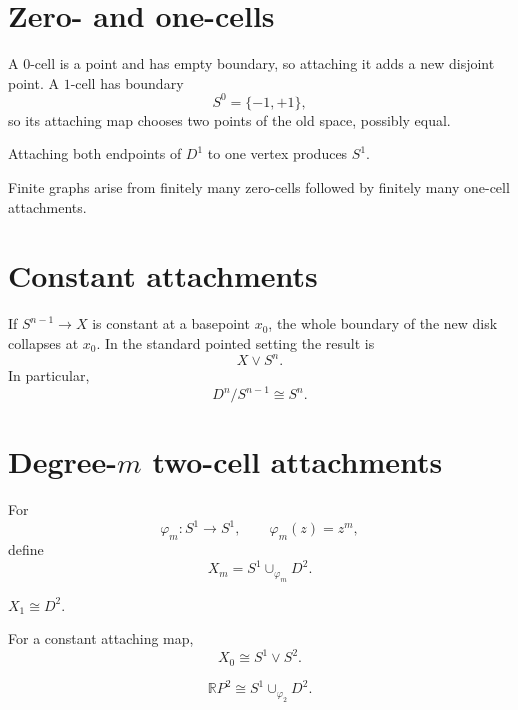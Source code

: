 \section{Zero- and one-cells}
A \(0\)-cell is a point and has empty boundary, so attaching it adds a new
disjoint point.  A \(1\)-cell has boundary
\[
S^0=\{-1,+1\},
\]
so its attaching map chooses two points of the old space, possibly equal.

\begin{example}[Loop]\label{ex:viii05-loop}
Attaching both endpoints of \(D^1\) to one vertex produces \(S^1\).
\end{example}

\begin{example}[Graphs]\label{ex:viii05-graphs}
Finite graphs arise from finitely many zero-cells followed by finitely many
one-cell attachments.
\end{example}

\section{Constant attachments}
\begin{proposition}\label{prop:viii05-constant}
If \(S^{n-1}\to X\) is constant at a basepoint \(x_0\), the whole boundary of
the new disk collapses at \(x_0\).  In the standard pointed setting the result
is
\[
X\vee S^n.
\]
In particular,
\[
D^n/S^{n-1}\cong S^n.
\]
\end{proposition}

\section{Degree-\(m\) two-cell attachments}
For
\[
\varphi_m:S^1\to S^1,\qquad \varphi_m(z)=z^m,
\]
define
\[
X_m=S^1\cup_{\varphi_m}D^2.
\]

\begin{example}\label{ex:viii05-degree-one}
\(X_1\cong D^2\).
\end{example}

\begin{example}\label{ex:viii05-degree-zero}
For a constant attaching map,
\[
X_0\cong S^1\vee S^2.
\]
\end{example}

\begin{example}\label{ex:viii05-rp2}
\[
\mathbb RP^2\cong S^1\cup_{\varphi_2}D^2.
\]
\end{example}

